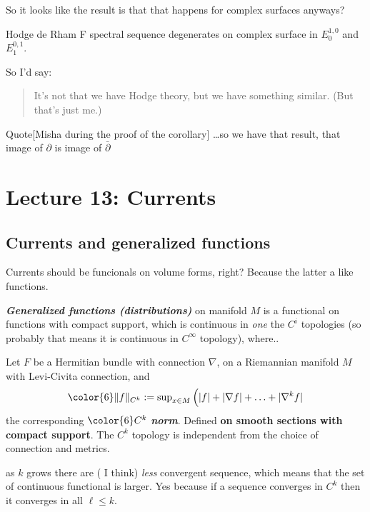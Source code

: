 So it looks like the result is that that happens for complex surfaces anyways?

\begin{coro}\leavevmode
Hodge de Rham F spectral sequence degenerates on complex surface in \(E^{1,0}_0\) and \(E^{0,1}_1\).
\end{coro}

So I'd say:
\begin{quotation}
	It's not that we have Hodge theory, but we have something similar. (But that's just me.)
\end{quotation}

\begin{thing4}{Quote}[Misha during the proof of the corollary]\leavevmode
…so we have that result, that image of \(\partial \) is image of \(\bar\partial\)
\end{thing4}

\section{Lecture 13: Currents}

\subsection{Currents and generalized functions}

Currents should be funcionals on volume forms, right? Because the latter a like functions.

\begin{defn}\leavevmode
\textit{\textbf{Generalized functions (distributions)}} on manifold \(M\) is a functional on functions with compact support, which is continuous in \textit{one}  the \(C^i\) topologies (so probably that means it is continuous in \(C^\infty\) topology), where..
\end{defn}

\begin{defn}\leavevmode
Let \(F\) be a Hermitian bundle with connection \(\nabla\), on a Riemannian manifold \(M\) with Levi-Civita connection, and
\[{\color{6}\|f\|_{C^k}:=\operatorname{sup}_{x \in M}\Big(|f|+|\nabla f|+\ldots+|\nabla^kf|}\]
the corresponding \({\color{6}C^k}\) \textit{\textbf{norm}}. Defined \textbf{on smooth sections with compact support}. The \(C^k\) topology is independent from the choice of connection and metrics.
\end{defn}

\begin{remark}[Misha]\leavevmode
as \(k\) grows there are ( I think) \textit{less} convergent sequence, which means that the set of continuous functional is larger. Yes because if a sequence converges in \(C^k\) then it converges in all \(\ell \leq k\).
\end{remark}

